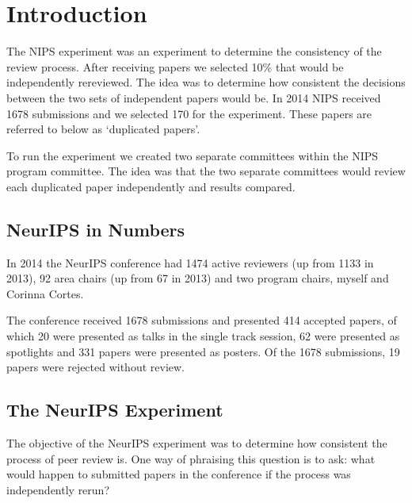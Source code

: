 


\hypertarget{introduction}{%
\section{Introduction}\label{introduction}}

The NIPS experiment was an experiment to determine the consistency of
the review process. After receiving papers we selected 10\% that would
be independently rereviewed. The idea was to determine how consistent
the decisions between the two sets of independent papers would be. In
2014 NIPS received 1678 submissions and we selected 170 for the
experiment. These papers are referred to below as `duplicated papers'.

To run the experiment we created two separate committees within the NIPS
program committee. The idea was that the two separate committees would
review each duplicated paper independently and results compared.

\hypertarget{neurips-in-numbers}{%
\subsection{NeurIPS in Numbers}\label{neurips-in-numbers}}

\begin{flushright}
\end{flushright}

In 2014 the NeurIPS conference had 1474 active reviewers (up from 1133
in 2013), 92 area chairs (up from 67 in 2013) and two program chairs,
myself and Corinna Cortes.

The conference received 1678 submissions and presented 414 accepted
papers, of which 20 were presented as talks in the single track session,
62 were presented as spotlights and 331 papers were presented as
posters. Of the 1678 submissions, 19 papers were rejected without
review.

\hypertarget{the-neurips-experiment}{%
\subsection{The NeurIPS Experiment}\label{the-neurips-experiment}}

The objective of the NeurIPS experiment was to determine how consistent
the process of peer review is. One way of phraising this question is to
ask: what would happen to submitted papers in the conference if the
process was independently rerun?

